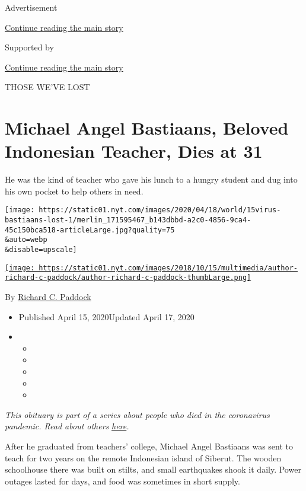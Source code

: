 Advertisement

\protect\hyperlink{after-top}{Continue reading the main story}

Supported by

\protect\hyperlink{after-sponsor}{Continue reading the main story}

THOSE WE'VE LOST

\hypertarget{michael-angel-bastiaans-beloved-indonesian-teacher-dies-at-31}{%
\section{Michael Angel Bastiaans, Beloved Indonesian Teacher, Dies at
31}\label{michael-angel-bastiaans-beloved-indonesian-teacher-dies-at-31}}

He was the kind of teacher who gave his lunch to a hungry student and
dug into his own pocket to help others in need.

\texttt{[image: https://static01.nyt.com/images/2020/04/18/world/15virus-bastiaans-lost-1/merlin\_171595467\_b143dbbd-a2c0-4856-9ca4-45c150bca518-articleLarge.jpg?quality=75\\\&auto=webp\\\&disable=upscale]}

\href{https://www.nytimes.com/by/richard-c-paddock}{\texttt{[image: https://static01.nyt.com/images/2018/10/15/multimedia/author-richard-c-paddock/author-richard-c-paddock-thumbLarge.png]}}

By \href{https://www.nytimes.com/by/richard-c-paddock}{Richard C.
Paddock}

\begin{itemize}
\item
  Published April 15, 2020Updated April 17, 2020
\item
  \begin{itemize}
  \item
  \item
  \item
  \item
  \item
  \end{itemize}
\end{itemize}

\emph{This obituary is part of a series about people who died in the
coronavirus pandemic. Read about others}
\href{https://www.nytimes.com/series/people-who-have-died-of-the-coronavirus}{\emph{here}}\emph{.}

After he graduated from teachers' college, Michael Angel Bastiaans was
sent to teach for two years on the remote Indonesian island of Siberut.
The wooden schoolhouse there was built on stilts, and small earthquakes
shook it daily. Power outages lasted for days, and food was sometimes in
short supply.

